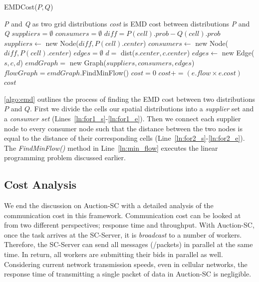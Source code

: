\begin{algorithm}[h]
\caption{EMDCost($P, Q$)}
\label{algo:emd}
\begin{algorithmic}[1]
\REQUIRE \emph{P} and \emph{Q} as two grid distributions
\ENSURE \emph{cost} is EMD cost between distributions \emph{P} and \emph{Q}
\STATE $suppliers = \emptyset$
\STATE $consumers = \emptyset$
\label{ln:for1_s}
	\STATE $diff = P(cell).prob - Q(cell).prob$
		\STATE $suppliers \leftarrow$ new Node($diff, P(cell).center$)
	\ELSE
		\STATE $consumers \leftarrow$ new Node($diff, P(cell).center$)
	\ENDIF
\ENDFOR\label{ln:for1_e}
\STATE $edges = \emptyset$
\label{ln:for2_s}
		\STATE $d =$ dist($s.center, c.center$)
		\STATE $edges \leftarrow$ new Edge($s, c, d$)
	\ENDFOR
\ENDFOR\label{ln:for2_e}
\STATE $emdGraph =$ new Graph($suppliers, consumers, edges$)
\STATE $flowGraph = emdGraph$.FindMinFlow()\label{ln:min_flow}
\STATE $cost = 0$
	\STATE $cost += (e.flow \times e.cost)$
\ENDFOR
\RETURN $cost$
\end{algorithmic}
\end{algorithm}

\cref{algo:emd} outlines the process of finding the EMD cost between two distributions $P$ and $Q$. First we divide the cells our spatial distributions into a \textit{supplier} set and a \textit{consumer set} (Lines~\ref{ln:for1_s}-\ref{ln:for1_e}). Then we connect each supplier node to every consumer node such that the distance between the two nodes is equal to the distance of their corresponding cells (Line~\ref{ln:for2_s}-\ref{ln:for2_e}). The \textit{FindMinFlow()} method in Line~\ref{ln:min_flow} executes the linear programming problem discussed earlier.

\subsection{Cost Analysis}

We end the discussion on Auction-SC with a detailed analysis of the communication cost in this framework. Communication cost can be looked at from two different perspectives; response time and throughput. With Auction-SC, once the task arrives at the SC-Server, it is \textit{broadcast} to a number of workers. Therefore, the SC-Server can send all messages (/packets) in parallel at the same time. In return, all workers are submitting their bids in parallel as well. Considering current network transmission speeds, even in cellular networks, the response time of transmitting a single packet of data in Auction-SC is negligible.

